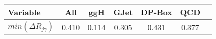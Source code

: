 \documentclass{article}
\begin{document}
\begin{center}
\begin{tabular}{| l || c | c | c | c | c | c |}
\hline
Variable & All & ggH & GJet & DP-Box & QCD \\ \hline
$min(\Delta{R}_{j\gamma})$ & 0.410 & 0.114 & 0.305 & 0.431 & 0.377 \\ 
\hline
\end{tabular}
\end{center}
\end{document}
